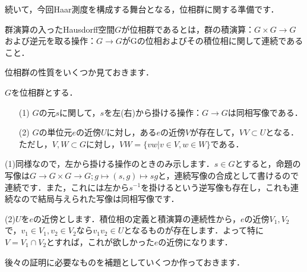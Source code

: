 続いて，今回Haar測度を構成する舞台となる，位相群に関する準備です．

\begin{ydefi}[位相群]\label{12}
群演算の入ったHausdorff空間$G$が位相群であるとは，群の積演算：$G \times G \to G$および逆元を取る操作：$G \to G$がGの位相およびその積位相に関して連続であること．
\end{ydefi}
位相群の性質をいくつか見ておきます．
\begin{yprop}[位相群の性質]\label{13}
$G$を位相群とする．
\begin{itemize}
 \item[(1)]$G$の元$s$に関して，$s$を左(右)から掛ける操作：$G \to G$は同相写像である．
 \item[(2)]$G$の単位元$e$の近傍$U$に対し，ある$e$の近傍$V$が存在して，$VV \subset U$となる．ただし，$V,W \subset G$に対し，$VW= \{ vw | v \in V, w \in W \}$である．
\end{itemize}
\end{yprop}
\begin{Proof}
(1)同様なので，左から掛ける操作のときのみ示します．$s \in G$とすると，命題の写像は$G \to G \times G \to G ; g \mapsto (s,g) \mapsto sg$と，連続写像の合成として書けるので連続です．また，これには左から$s^{-1}$を掛けるという逆写像も存在し，これも連続なので結局与えられた写像は同相写像です．

(2)$U$を$e$の近傍とします．積位相の定義と積演算の連続性から，$e$の近傍$V_1, V_2$で，$v_{1} \in V_1, v_{2} \in V_2$なら$v_{1}v_{2} \in U$となるものが存在します．よって特に$V=V_1 \cap V_2$とすれば，これが欲しかった$e$の近傍になります．
\end{Proof}
後々の証明に必要なものを補題としていくつか作っておきます．

